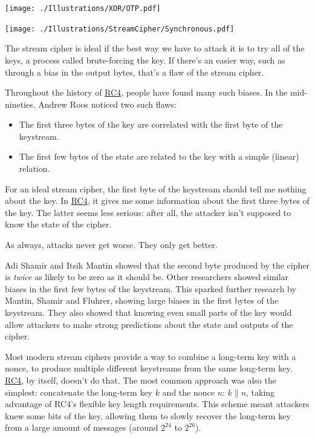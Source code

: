 \documentclass[11pt,ebook,table,dvipsnames]{memoir}
\begin{document}
\texttt{[image: ./Illustrations/XOR/OTP.pdf]}

\texttt{[image: ./Illustrations/StreamCipher/Synchronous.pdf]}

The stream cipher is ideal if the best way we have to attack it is to
try all of the keys, a process called brute-forcing the key. If
there's an easier way, such as through a bias in the output bytes,
that's a flaw of the stream cipher.

Throughout the history of \hyperref[RC4]{RC4}, people have found many such biases. In
the mid-nineties, Andrew Roos noticed two such flaws:

\begin{itemize}
\item The first three bytes of the key are correlated with the first byte
of the keystream.
\item The first few bytes of the state are related to the key with a
simple (linear) relation.
\end{itemize}

For an ideal stream cipher, the first byte of the keystream should
tell me nothing about the key. In \hyperref[RC4]{RC4}, it gives me some information
about the first three bytes of the key. The latter seems less serious:
after all, the attacker isn't supposed to know the state of the
cipher.

As always, attacks never get worse. They only get better.

Adi Shamir and Itsik Mantin showed that the second byte produced by
the cipher is \emph{twice} as likely to be zero as it should be. Other
researchers showed similar biases in the first few bytes of the
keystream. This sparked further research by Mantin, Shamir and
Fluhrer\cite{fms:rc4}, showing large biases in the first bytes of the
keystream. They also showed that knowing even small parts of the key
would allow attackers to make strong predictions about the state and
outputs of the cipher.

Most modern stream ciphers provide a way to combine a long-term key
with a \gls{nonce}, to produce multiple different keystreams from the
same long-term key. \hyperref[RC4]{RC4}, by itself, doesn't do that. The most common
approach was also the simplest: concatenate the long-term key $k$ and
the nonce $n$: $k \| n$, taking advantage of RC4's flexible key length
requirements. This scheme meant attackers knew some bits of the key,
allowing them to slowly recover the long-term key from a large amount
of messages (around $2^{24}$ to $2^{26}$).
\end{document}
